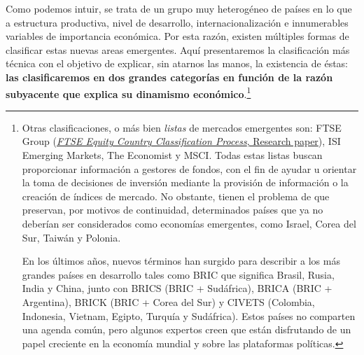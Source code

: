 \documentclass[10pt,a4paper]{article}
\begin{document}
Como podemos intuir, se trata de un grupo muy heterogéneo de países en lo que a estructura productiva, nivel de desarrollo, internacionalización e innumerables variables de importancia económica. Por esta razón, existen múltiples formas de clasificar estas nuevas areas emergentes. Aquí presentaremos la clasificación más técnica con el objetivo de explicar, sin atarnos las manos, la existencia de éstas: \textbf{las clasificaremos en dos grandes categorías en función de la razón subyacente que explica su dinamismo económico}.\footnote{%
    Otras clasificaciones, o más bien \textit{listas} de mercados emergentes son: FTSE Group (\href{https://www.lseg.com/content/dam/ftse-russell/en_us/documents/country-classification/ftse-equity-country-classification-paper.pdf}{\textit{FTSE Equity Country Classification Process}, Research paper}), ISI Emerging Markets, The Economist y MSCI. Todas estas listas buscan proporcionar información a gestores de fondos, con el fin de ayudar u orientar la toma de decisiones de inversión mediante la provisión de información o la creación de índices de mercado. No obstante, tienen el problema de que preservan, por motivos de continuidad, determinados países que ya no deberían ser considerados como economías emergentes, como Israel, Corea del Sur, Taiwán y Polonia.

En los últimos años, nuevos términos han surgido para describir a los más grandes países en desarrollo tales como BRIC que significa Brasil, Rusia, India y China, junto con BRICS (BRIC + Sudáfrica), BRICA (BRIC + Argentina), BRICK (BRIC + Corea del Sur) y CIVETS (Colombia, Indonesia, Vietnam, Egipto, Turquía y Sudáfrica). Estos países no comparten una agenda común, pero algunos expertos creen que están disfrutando de un papel creciente en la economía mundial y sobre las plataformas políticas.
}
\end{document}
